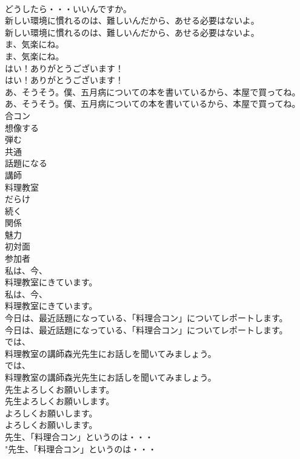\documentclass[8pt]{extreport}
\begin{document}
\begin{CJK}{UTF8}{min}
\\	どうしたら・・・いいんですか。 
\\	新しい環境に慣れるのは、難しいんだから、あせる必要はないよ。	
\\	新しい環境に慣れるのは、難しいんだから、あせる必要はないよ。 
\\	ま、気楽にね。	
\\	ま、気楽にね。 
\\	はい！ありがとうございます！	
\\	はい！ありがとうございます！ 
\\	あ、そうそう。僕、五月病についての本を書いているから、本屋で買ってね。	
\\	あ、そうそう。僕、五月病についての本を書いているから、本屋で買ってね。 
\\	合コン
\\	想像する
\\	弾む
\\	共通
\\	話題になる
\\	講師
\\	料理教室
\\	だらけ
\\	続く
\\	関係
\\	魅力
\\	初対面
\\	参加者
\\	私は、今、
\\	料理教室にきています。	
\\	私は、今、
\\	料理教室にきています。 
\\	今日は、最近話題になっている、「料理合コン」についてレポートします。	
\\	今日は、最近話題になっている、「料理合コン」についてレポートします。 
\\	では、
\\	料理教室の講師森光先生にお話しを聞いてみましょう。	
\\	では、
\\	料理教室の講師森光先生にお話しを聞いてみましょう。 
\\	先生よろしくお願いします。	
\\	先生よろしくお願いします。 
\\	よろしくお願いします。	
\\	よろしくお願いします。 
\\	先生、「料理合コン」というのは・・・	
\\	"先生、「料理合コン」というのは・・・ 

\end{CJK}
\end{document}
